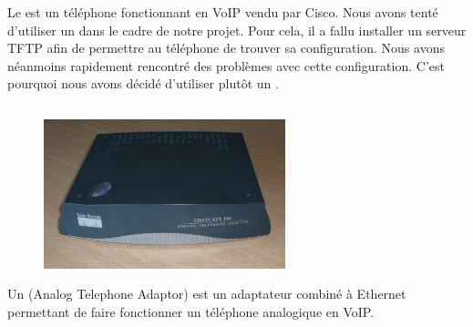 Le {\cph} est un téléphone fonctionnant en VoIP vendu par Cisco. Nous avons tenté d'utiliser un {\cph} dans le cadre de notre projet. Pour cela, il a fallu installer un serveur TFTP afin de permettre au téléphone de trouver sa configuration.
Nous avons néanmoins rapidement rencontré des problèmes avec cette configuration.
C'est pourquoi nous avons décidé d'utiliser plutôt un {\ata}. 

\subsection{\cata}

\begin{figure}[h]
\begin{center}
\includegraphics[width=7cm]{images/ata.jpg}
\end{center}
\caption{\ata}
\end{figure}

Un {\ata} (Analog Telephone Adaptor) est un adaptateur combiné à Ethernet permettant de faire fonctionner un téléphone analogique en VoIP.

